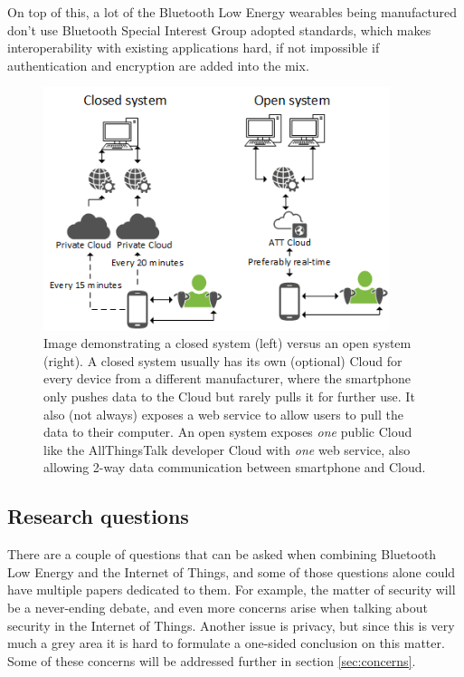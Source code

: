 \documentclass[pdftex,a4paper,12pt,twoside]{report}
\begin{document}
On top of this, a lot of the Bluetooth Low Energy wearables being manufactured don't use Bluetooth Special Interest Group adopted standards, which makes interoperability with existing applications hard, if not impossible if authentication and encryption are added into the mix.

\begin{figure}[h]
    \centering
    \includegraphics[width=0.9\textwidth]{img/networkloop.png}
    \caption[Image demonstrating a closed Cloud system versus an open Cloud system]{Image demonstrating a closed system (left) versus an open system (right). A closed system usually has its own (optional) Cloud for every device from a different manufacturer, where the smartphone only pushes data to the Cloud but rarely pulls it for further use. It also (not always) exposes a web service to allow users to pull the data to their computer. An open system exposes \textit{one} public Cloud like the AllThingsTalk developer Cloud with \textit{one} web service, also allowing 2-way data communication between smartphone and Cloud.}
    \label{fig:networkloops}
\end{figure}

\subsection{Research questions}
\label{subsec:researchquestions}
There are a couple of questions that can be asked when combining Bluetooth Low Energy and the Internet of Things, and some of those questions alone could have multiple papers dedicated to them. For example, the matter of security will be a never-ending debate, and even more concerns arise when talking about security in the Internet of Things. Another issue is privacy, but since this is very much a grey area it is hard to formulate a one-sided conclusion on this matter. Some of these concerns will be addressed further in section \ref{sec:concerns}.
\end{document}
